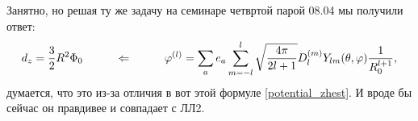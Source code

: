 Занятно, но решая ту же задачу на семинаре четвртой парой 08.04 мы получили ответ:
\begin{equation*}
    d_z = \frac{3}{2}R^2 \Phi_0     
    \hspace{1 cm}
    \Leftarrow
    \hspace{1 cm}
    \varphi^{(l)} = \sum_a e_a\sum_{m = -l}^l \sqrt{\frac{4 \pi}{2 l +1}} D_l^{(m)} Y_{l m} (\theta, \varphi) \frac{1}{R_0^{l+1}},
\end{equation*}
думается, что это из-за отличия в вот этой формуле \eqref{potential_zhest}. И вроде бы сейчас он правдивее и совпадает с ЛЛ2.
